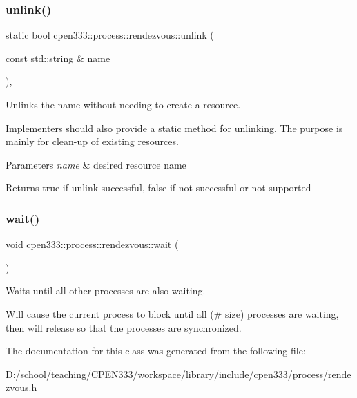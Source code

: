 \subsubsection{\texorpdfstring{unlink()}{unlink()}\hspace{0.1cm}{\footnotesize\ttfamily [2/2]}}
{\footnotesize\ttfamily static bool cpen333\+::process\+::rendezvous\+::unlink (\begin{DoxyParamCaption}\item[{const std\+::string \&}]{name }\end{DoxyParamCaption})\hspace{0.3cm}{\ttfamily [inline]}, {\ttfamily [static]}}



Unlinks the name without needing to create a resource. 

Implementers should also provide a static method for unlinking. The purpose is mainly for clean-\/up of existing resources.


\begin{DoxyParams}{Parameters}
{\em name} & desired resource name \\
\hline
\end{DoxyParams}
\begin{DoxyReturn}{Returns}
{\ttfamily true} if unlink successful, {\ttfamily false} if not successful or not supported 
\end{DoxyReturn}
\mbox{\label{classcpen333_1_1process_1_1rendezvous_a47603f8bc2aaf9302cb8132262912863}} 
\subsubsection{\texorpdfstring{wait()}{wait()}}
{\footnotesize\ttfamily void cpen333\+::process\+::rendezvous\+::wait (\begin{DoxyParamCaption}{ }\end{DoxyParamCaption})\hspace{0.3cm}{\ttfamily [inline]}}



Waits until all other processes are also waiting. 

Will cause the current process to block until all (\# size) processes are waiting, then will release so that the processes are synchronized. 

The documentation for this class was generated from the following file\+:\begin{DoxyCompactItemize}
\item 
D\+:/school/teaching/\+C\+P\+E\+N333/workspace/library/include/cpen333/process/\hyperlink{process_2rendezvous_8h}{rendezvous.\+h}\end{DoxyCompactItemize}
